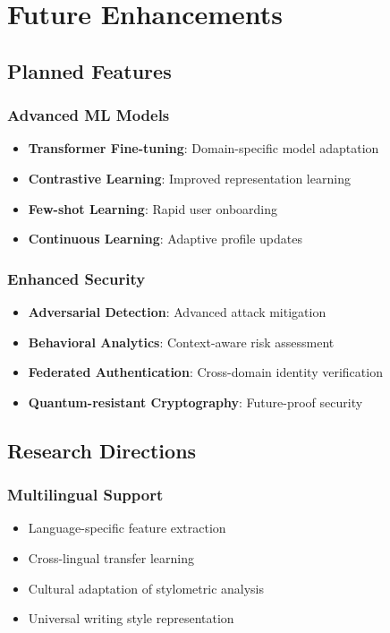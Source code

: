 \documentclass[12pt,a4paper]{article}
\begin{document}
\section{Future Enhancements}

\subsection{Planned Features}

\subsubsection{Advanced ML Models}
\begin{itemize}
    \item \textbf{Transformer Fine-tuning}: Domain-specific model adaptation
    \item \textbf{Contrastive Learning}: Improved representation learning
    \item \textbf{Few-shot Learning}: Rapid user onboarding
    \item \textbf{Continuous Learning}: Adaptive profile updates
\end{itemize}

\subsubsection{Enhanced Security}
\begin{itemize}
    \item \textbf{Adversarial Detection}: Advanced attack mitigation
    \item \textbf{Behavioral Analytics}: Context-aware risk assessment
    \item \textbf{Federated Authentication}: Cross-domain identity verification
    \item \textbf{Quantum-resistant Cryptography}: Future-proof security
\end{itemize}

\subsection{Research Directions}

\subsubsection{Multilingual Support}
\begin{itemize}
    \item Language-specific feature extraction
    \item Cross-lingual transfer learning
    \item Cultural adaptation of stylometric analysis
    \item Universal writing style representation
\end{itemize}
\end{document}

